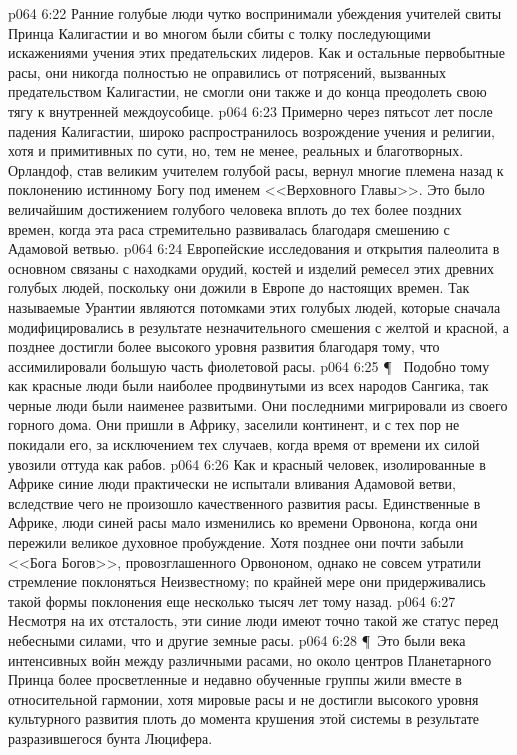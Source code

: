 \vs p064 6:22 Ранние голубые люди чутко воспринимали убеждения учителей свиты Принца Калигастии и во многом были сбиты с толку последующими искажениями учения этих предательских лидеров. Как и остальные первобытные расы, они никогда полностью не оправились от потрясений, вызванных предательством Калигастии, не смогли они также и до конца преодолеть свою тягу к внутренней междоусобице.
\vs p064 6:23 Примерно через пятьсот лет после падения Калигастии, широко распространилось возрождение учения и религии, хотя и примитивных по сути, но, тем не менее, реальных и благотворных. Орландоф, став великим учителем голубой расы, вернул многие племена назад к поклонению истинному Богу под именем <<Верховного Главы>>. Это было величайшим достижением голубого человека вплоть до тех более поздних времен, когда эта раса стремительно развивалась благодаря смешению с Адамовой ветвью.
\vs p064 6:24 Европейские исследования и открытия палеолита в основном связаны с находками орудий, костей и изделий ремесел этих древних голубых людей, поскольку они дожили в Европе до настоящих времен. Так называемые  Урантии являются потомками этих голубых людей, которые сначала модифицировались в результате незначительного смешения с желтой и красной, а позднее достигли более высокого уровня развития благодаря тому, что ассимилировали большую часть фиолетовой расы.
\vs p064 6:25 \P\ \bibnobreakspace {} Подобно тому как красные люди были наиболее продвинутыми из всех народов Сангика, так черные люди были наименее развитыми. Они последними мигрировали из своего горного дома. Они пришли в Африку, заселили континент, и с тех пор не покидали его, за исключением тех случаев, когда время от времени их силой увозили оттуда как рабов.
\vs p064 6:26 Как и красный человек, изолированные в Африке синие люди практически не испытали вливания Адамовой ветви, вследствие чего не произошло качественного развития расы. Единственные в Африке, люди синей расы мало изменились ко времени Орвонона, когда они пережили великое духовное пробуждение. Хотя позднее они почти забыли <<Бога Богов>>, провозглашенного Орвононом, однако не совсем утратили стремление поклоняться Неизвестному; по крайней мере они придерживались такой формы поклонения еще несколько тысяч лет тому назад.
\vs p064 6:27 Несмотря на их отсталость, эти синие люди имеют точно такой же статус перед небесными силами, что и другие земные расы.
\vs p064 6:28 \P\ Это были века интенсивных войн между различными расами, но около центров Планетарного Принца более просветленные и недавно обученные группы жили вместе в относительной гармонии, хотя мировые расы и не достигли высокого уровня культурного развития плоть до момента крушения этой системы в результате разразившегося бунта Люцифера.

